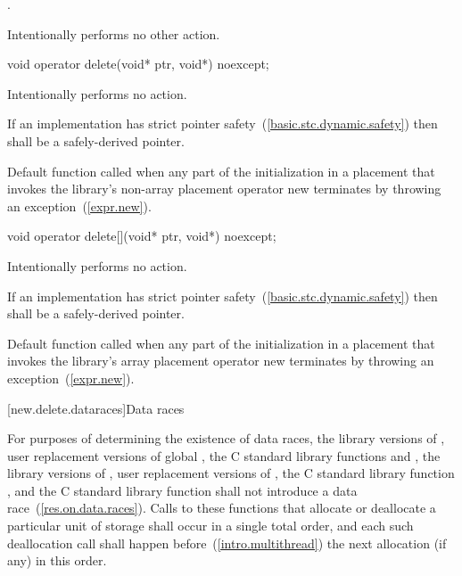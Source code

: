 \begin{itemdescr}
\pnum
\returns
{}.

\pnum
\remarks
Intentionally performs no other action.
\end{itemdescr}

%
\begin{itemdecl}
void operator delete(void* ptr, void*) noexcept;
\end{itemdecl}

\begin{itemdescr}
\pnum
\effects
Intentionally performs no action.

\pnum
\requires
If an implementation has strict pointer safety~(\ref{basic.stc.dynamic.safety})
then  shall be a safely-derived pointer.

\pnum
\remarks
Default function called when any part of the initialization in a
placement  that invokes the library's
non-array placement operator new
terminates by throwing an exception~(\ref{expr.new}).
\end{itemdescr}

%
\begin{itemdecl}
void operator delete[](void* ptr, void*) noexcept;
\end{itemdecl}

\begin{itemdescr}
\pnum
\effects
Intentionally performs no action.

\pnum
\requires
If an implementation has strict pointer safety~(\ref{basic.stc.dynamic.safety})
then  shall be a safely-derived pointer.

\pnum
\remarks
Default function called when any part of the initialization in a
placement  that invokes the library's
array placement operator new
terminates by throwing an exception~(\ref{expr.new}).
\end{itemdescr}

[new.delete.dataraces]{Data races}

\pnum
For purposes of determining the existence of data races, the library versions
of , user replacement versions of global ,
the C standard library functions  and , the library
versions of , user replacement
versions of , the C standard library function
, and the C standard library function  shall not
introduce a data race~(\ref{res.on.data.races}).
Calls to these functions that allocate or deallocate a particular unit
of storage shall occur in a single total order, and each such deallocation call
shall happen before~(\ref{intro.multithread}) the next allocation (if any) in
this order.

